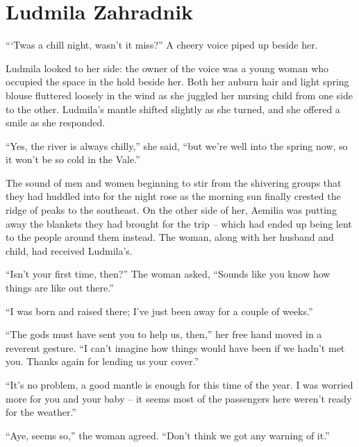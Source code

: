 

\chapter{Ludmila Zahradnik}

“‘Twas a chill night, wasn’t it miss?” A cheery voice piped up beside her.

 

Ludmila looked to her side: the owner of the voice was a young woman who occupied the space in the hold beside her. Both her auburn hair and light spring blouse fluttered loosely in the wind as she juggled her nursing child from one side to the other. Ludmila’s mantle shifted slightly as she turned, and she offered a smile as she responded.

 

“Yes, the river is always chilly,” she said, “but we’re well into the spring now, so it won’t be so cold in the Vale.”

 

The sound of men and women beginning to stir from the shivering groups that they had huddled into for the night rose as the morning sun finally crested the ridge of peaks to the southeast. On the other side of her, Aemilia was putting away the blankets they had brought for the trip – which had ended up being lent to the people around them instead. The woman, along with her husband and child, had received Ludmila’s.

 

“Isn’t your first time, then?” The woman asked, “Sounds like you know how things are like out there.”

 

“I was born and raised there; I’ve just been away for a couple of weeks.”

 

“The gods must have sent you to help us, then,” her free hand moved in a reverent gesture. “I can’t imagine how things would have been if we hadn’t met you. Thanks again for lending us your cover.”

 

“It’s no problem, a good mantle is enough for this time of the year. I was worried more for you and your baby – it seems most of the passengers here weren’t ready for the weather.”

 

“Aye, seems so,” the woman agreed. “Don’t think we got any warning of it.”

 

